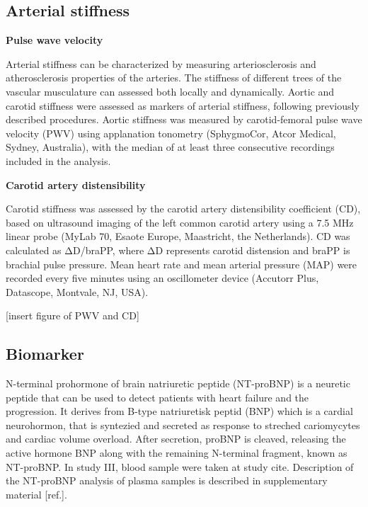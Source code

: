 \documentclass[
  a4paper,
  headsepline=true,
  open=any]{scrbook}
\begin{document}
\hypertarget{arterial-stiffness}{%
\subsection{Arterial stiffness}\label{arterial-stiffness}}

\textbf{Pulse wave velocity}

Arterial stiffness can be characterized by measuring arteriosclerosis
and atherosclerosis properties of the arteries. The stiffness of
different trees of the vascular musculature can assessed both locally
and dynamically. Aortic and carotid stiffness were assessed as markers
of arterial stiffness, following previously described procedures. Aortic
stiffness was measured by carotid-femoral pulse wave velocity (PWV)
using applanation tonometry (SphygmoCor, Atcor Medical, Sydney,
Australia), with the median of at least three consecutive recordings
included in the analysis.

\textbf{Carotid artery distensibility}

Carotid stiffness was assessed by the carotid artery distensibility
coefficient (CD), based on ultrasound imaging of the left common carotid
artery using a 7.5 MHz linear probe (MyLab 70, Esaote Europe,
Maastricht, the Netherlands). CD was calculated as ΔD/braPP, where ΔD
represents carotid distension and braPP is brachial pulse pressure. Mean
heart rate and mean arterial pressure (MAP) were recorded every five
minutes using an oscillometer device (Accutorr Plus, Datascope,
Montvale, NJ, USA).

{[}insert figure of PWV and CD{]}

\hypertarget{biomarker}{%
\subsection{Biomarker}\label{biomarker}}

N-terminal prohormone of brain natriuretic peptide (NT-proBNP) is a
neuretic peptide that can be used to detect patients with heart failure
and the progression. It derives from B-type natriuretisk peptid (BNP)
which is a cardial neurohormon, that is syntezied and secreted as
response to streched cariomycytes and cardiac volume overload. After
secretion, proBNP is cleaved, releasing the active hormone BNP along
with the remaining N-terminal fragment, known as NT-proBNP. In study
III, blood sample were taken at study cite. Description of the NT-proBNP
analysis of plasma samples is described in supplementary material
{[}ref.{]}.
\end{document}
